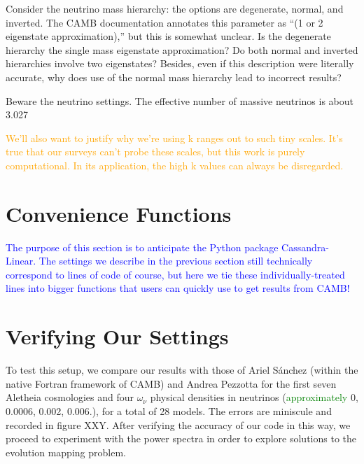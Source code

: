 Consider the neutrino mass 
hierarchy: the options are degenerate, normal, and inverted. The CAMB 
documentation annotates this parameter as ``(1 or 2 eigenstate 
approximation),'' but this is somewhat unclear. Is the degenerate hierarchy 
the single mass eigenstate approximation? Do both normal and inverted 
hierarchies involve two eigenstates? Besides, even if this description were
literally accurate, why does use of the normal mass hierarchy lead to
incorrect results?

Beware the neutrino settings. The effective number of massive neutrinos is about 3.027


\textcolor{orange}{We'll also want to justify why we're using k ranges out to
such tiny scales. It's true that our surveys can't probe these scales, but
this work is purely computational. In its application, the high k values can
always be disregarded.}

\section{Convenience Functions}


\textcolor{blue}{The purpose of this section is to anticipate the Python
package Cassandra-Linear. The settings we describe in the previous section
still technically correspond to lines of code of course, but here we tie these
individually-treated lines into bigger functions that users can quickly use to
get results from CAMB!}

\section{Verifying Our Settings}


To test this setup, we compare our results with those of Ariel S\'{a}nchez 
(within the native Fortran framework of CAMB) and Andrea Pezzotta for the
first seven Aletheia cosmologies and four $\omega_\nu$ physical densities in
neutrinos (\textcolor{green}{approximately} 0, 0.0006, 0.002, 0.006.), for a 
total of 28
models. The errors are miniscule and recorded in figure XXY. After verifying
the accuracy of our code in this way, we proceed to experiment with the power
spectra in order to explore solutions to the evolution mapping problem.


